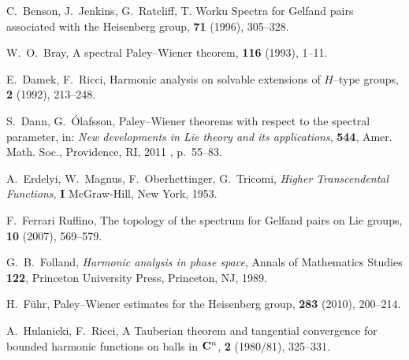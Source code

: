 \documentclass[12pt,a4paper]{amsart}
\theoremstyle{plain}
\theoremstyle{definition}
\numberwithin{equation}{section}
\begin{document}
\begin{thebibliography}{9999}
     
     
    {{\textrm{{C.~Benson, J.~Jenkins, G.~Ratcliff, T. Worku}}}}
    {{\textrm {{Spectra for Gelfand pairs associated with the
Heisenberg
       group}}}},
    {{\textit{}}}
    {{\textbf{{71}}}}
     (1996), 305--328.

	{{\textrm{{W.~O.~Bray,}}}}
	{{\textrm {{A spectral Paley--Wiener theorem}}}},
   {{\textit{}}}
   {{\textbf{{116}}}}
   (1993), {1--11}.

    {{\textrm{{E.~Damek, F.~Ricci,}}}}
    {{\textrm {{Harmonic analysis on solvable extensions of $H$--type groups}}}},
    {{\textit{}}}
    {{\textbf{{2}}}}
     (1992), 213--248.
     
     
     
	{{\textrm{{S.~Dann, G.~\'Olafsson,}}}}
     {{\textrm {{Paley--Wiener theorems with respect to the spectral parameter}}}},
     in: {{\textit{{New developments in Lie theory and its applications}}}}, 
	{{\textit{}}} {{\textbf{{544}}}}, Amer. Math. Soc., Providence, RI, 2011
	, p.~55--83. 

	{{\textrm{{A.~Erdelyi, W.~Magnus, F.~Oberhettinger, G.~Tricomi,}}}}
	{{\textit{{Higher Transcendental Functions}}}},
	 {{\textbf{{\uppercase{i}}}}}
	McGraw-Hill, New York, 1953.

    {{\textrm{{F.~Ferrari Ruffino,}}}}
    {{\textrm {{The topology of the spectrum for Gelfand pairs on Lie groups}}}},
    {{\textit{}}}
 {{\textbf{{10}}}} (2007),  569--579. 

{{\textrm{{G.~B.~Folland,}}}}
	{{\textit{{Harmonic analysis in phase space}}}},
	Annals of Mathematics Studies
	{{\textbf{{122}}}}, 
	Princeton University Press, Princeton, NJ,  1989.

	{{\textrm{{H.~F\"uhr,}}}}
	{{\textrm {{Paley--Wiener estimates for the Heisenberg group}}}},
	{{\textit{}}}
	{{\textbf{{283}}}}  (2010),  200--214.

    {{\textrm{{A.~Hulanicki, F.~Ricci,}}}}
    {{\textrm {{A {T}auberian theorem and tangential convergence for bounded
              harmonic functions on balls in {${\bf C}^{n}$}}}}},
    {{\textit{}}}
    {{\textbf{{2}}}}
     (1980/81), 325--331.


\end{thebibliography}
\end{document}
